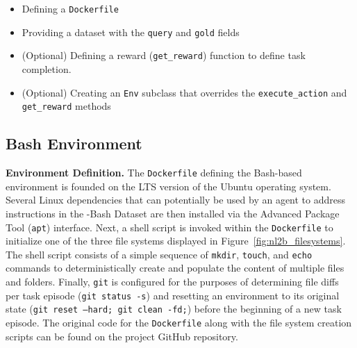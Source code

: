 \begin{itemize}[noitemsep,topsep=0pt]
    \item Defining a \texttt{Dockerfile}
    \item Providing a dataset with the \texttt{query} and \texttt{gold} fields
    \item (Optional) Defining a reward (\texttt{get\_reward}) function to define task completion.
    \item (Optional) Creating an \texttt{\benchmark{}Env} subclass that overrides the \texttt{execute\_action} and \texttt{get\_reward} methods
\end{itemize}

\subsection{Bash Environment}
\label{appx:env:bashenv}
\textbf{Environment Definition.} The \texttt{Dockerfile} defining the Bash-based environment is founded on the LTS version of the Ubuntu operating system. Several Linux dependencies that can potentially be used by an agent to address instructions in the \benchmark{}-Bash Dataset are then installed via the Advanced Package Tool (\texttt{apt}) interface. Next, a shell script is invoked within the \texttt{Dockerfile} to initialize one of the three file systems displayed in Figure~\ref{fig:nl2b_filesystems}. The shell script consists of a simple sequence of \texttt{mkdir}, \texttt{touch}, and \texttt{echo} commands to deterministically create and populate the content of multiple files and folders. Finally, \texttt{git} is configured for the purposes of determining file diffs per task episode (\texttt{git status -s}) and resetting an environment to its original state (\texttt{git reset --hard; git clean -fd;}) before the beginning of a new task episode. The original code for the \texttt{Dockerfile} along with the file system creation scripts can be found on the project GitHub repository.



